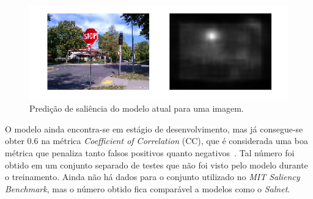 \documentclass[11pt]{article}
\newcommand{\tit}[1]{\textit{#1}}
\begin{document}
\begin{figure}[H]
    \centering
    \includegraphics[width=0.7\linewidth]{imgs/our.png}
    \caption{Predição de saliência do modelo atual para uma imagem.}
    \label{fig:att-deep-pred}
\end{figure}

O modelo ainda encontra-se em estágio de desenvolvimento, mas já consegue-se
obter 0.6 na métrica \tit{Coefficient of Correlation} (CC), que é considerada
uma boa métrica que penaliza tanto falsos positivos quanto
negativos~\cite{ref:metrics}.
Tal número foi obtido em um conjunto separado de testes que não foi visto
pelo modelo durante o treinamento.
Ainda não há dados para o conjunto utilizado no \tit{MIT Saliency Benchmark},
mas o número obtido fica comparável a modelos como o
\tit{Salnet}.
\end{document}
